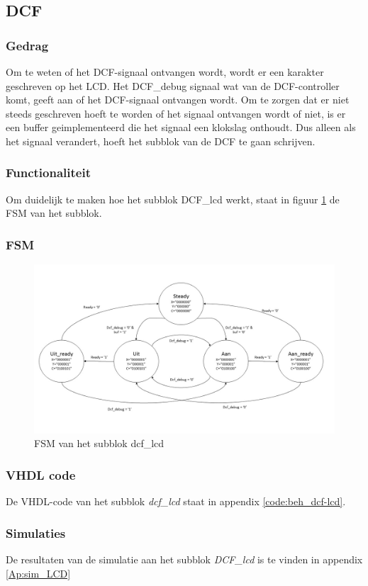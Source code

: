 \subsection{DCF}

\subsubsection{Gedrag}
Om te weten of het DCF-signaal ontvangen wordt, wordt er een karakter geschreven op het LCD. Het DCF\_debug signaal wat van de DCF-controller komt, geeft aan of het DCF-signaal ontvangen wordt. Om te zorgen dat er niet steeds geschreven hoeft te worden of het signaal ontvangen wordt of niet, is er een buffer geimplementeerd die het signaal een klokslag onthoudt. Dus alleen als het signaal verandert, hoeft het subblok van de DCF te gaan schrijven.

\subsubsection{Functionaliteit}
Om duidelijk te maken hoe het subblok DCF\_lcd werkt, staat in figuur \ref{fig:FSMdcf} de FSM van het subblok.

\subsubsection{FSM}

\begin{figure}[h!]
\includegraphics[width=15cm]{verslagschemas/FSMs/FSMdcf}
\caption{FSM van het subblok dcf\_lcd}
\label{fig:FSMdcf}
\end{figure}

\subsubsection{VHDL code}
De VHDL-code van het subblok \emph{dcf\_lcd} staat in appendix \ref{code:beh_dcf-lcd}.

\subsubsection{Simulaties}
De resultaten van de simulatie aan het subblok \emph{DCF\_lcd} is te vinden in appendix \ref{Ap:sim_LCD}
